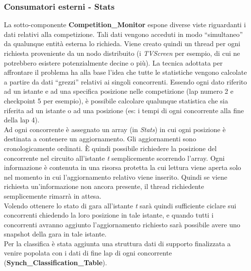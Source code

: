 \subsubsection{Consumatori esterni - Stats}
La sotto-componente \textbf{Competition\_Monitor} espone diverse viste riguardanti i dati relativi alla competizione. Tali dati vengono acceduti in modo ``simultaneo'' 
da qualunque entit\`{a} esterna lo richieda. Viene creato quindi un thread per ogni richiesta proveniente da un nodo distribuito (i \emph{TVScreen} per esempio, di cui
ne potrebbero esistere potenzialmente decine o pi\`{u}). La tecnica adottata
per affrontare il problema ha alla base l'idea che tutte le statistiche vengono calcolate a partire da dati ``grezzi'' relativi ai singoli concorrenti. Essendo ogni
dato riferito ad un istante e ad una specifica posizione nelle competizione (lap numero 2 e checkpoint 5 per esempio), \`{e} possibile calcolare qualunque statistica
che sia riferita ad un istante o ad una posizione (es: i tempi di ogni concorrente alla fine della lap 4).\\
Ad ogni concorrente \`{e} assegnato un array (in \emph{Stats}) in cui ogni posizione \`{e} destinata a contenere un aggiornamento. Gli aggiornamenti sono cronologicamente ordinati.
\`{E} quindi possibile richiedere la posizione del concorrente nel circuito all'istante \emph{t} semplicemente scorrendo l'array. Ogni informazione \`{e} contenuta in una risorsa
protetta la cui lettura viene aperta solo nel momento in cui l'aggiornamento relativo viene inserito. Quindi se viene richiesta un'informazione non ancora presente,
il thread richiedente semplicemente rimarr\`{a} in attesa.\\
Volendo ottenere lo stato di gara all'istante \emph{t} sar\`{a} quindi sufficiente ciclare sui concorrenti chiedendo la loro posizione in tale istante, e quando tutti i concorrenti
avranno aggiunto l'aggiornamento richiesto sar\`{a} possibile avere uno snapshot della gara in tale istante.\\
Per la classifica \`{e} stata aggiunta una struttura dati di supporto finalizzata a venire popolata con i dati di fine lap di ogni concorrente (\textbf{Synch\_Classification\_Table}).
